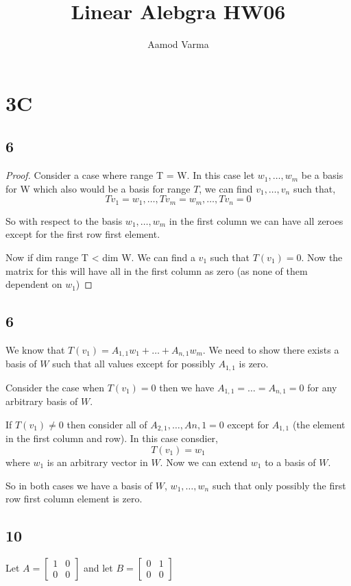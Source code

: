 \documentclass[a4paper]{report}
\title{Linear Alebgra HW06}
\author{Aamod Varma}
\begin{document}
\maketitle
\date{}


\section*{3C}


\subsection*{6}

\begin{proof}
    Consider a case where  range T =  W. In this case let $w_1,\dots,w_m$ be a basis for W which also would be a basis for range  $T$, we can find $v_1,\dots,v_n$ such that, 
    $$ Tv_1 = w_1,\dots,Tv_m=w_m,\dots,Tv_n = 0 $$ 

    So with respect to the basis $w_1,\dots,w_m$ in the first column we can have all zeroes except for the first row first element.

    Now if dim range T < dim W. We can find a $v_1$ such that $T(v_1) = 0$. Now the matrix for this will have all in the first column as zero (as none of them dependent on $w_1$)
\end{proof}


\subsection*{6}
We know that $T(v_1) = A_{1,1}w_1 + \dots + A_{n,1}w_m$. We need to show there exists a basis of $W$ such that all values except for possibly  $A_{1,1}$ is zero.

Consider the case when $T(v_1) = 0$ then we have $A_{1,1} = \dots = A_{n,1} = 0$ for any arbitrary basis of $W$.

If $T(v_1) \ne 0$ then consider all of $A_{2,1},\dots,A{n,1} = 0$ except for $A_{1,1}$ (the element in the first column and row). In this case consdier, 
$$ T(v_1) = w_1 $$ where $w_1$ is an arbitrary vector in $W$. Now we can extend $w_1$ to a basis of $W$.

So in both cases we have a basis of $W$, $w_1,\dots,w_n$ such that only possibly the first row first column element is zero.


\subsection*{10}
Let $A = \begin{bmatrix}
1 & 0\\
0 & 0 
\end{bmatrix}$
and let 
$B = \begin{bmatrix}
0 & 1\\
0 & 0 
\end{bmatrix}$
\end{document}
